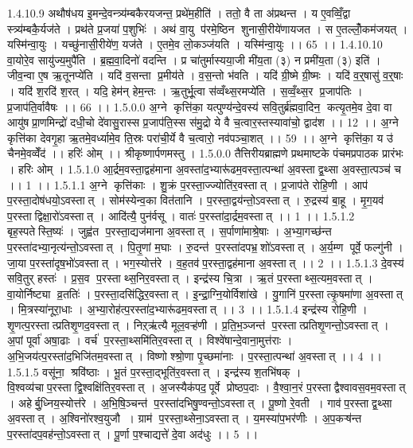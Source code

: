 1.4.10.9
अथौष॑धय इ॒मन्दे॒वन्त्र्य॑म्बकैरयजन्त॒ प्रथे॑म॒हीति॑ । ततो॒ वै ता अ॑प्रथन्त । य ए॒वव्विँ॒द्वा स्त्र्य॑म्बकै॒र्यज॑ते । प्रथ॑ते प्र॒जया॑ प॒शुभिः॑ । अथ॑ वा॒यु प॑रमे॒ष्ठिन॑ शुनासी॒रीये॑णायजत । स ए॒तल्लोँ॒कम॑जयत् । यस्मि॑न्वा॒युः । यच्छु॑नासी॒रीये॑ण॒ यज॑ते । ए॒तमे॒व लो॒कञ्ज॑यति । यस्मि॑न्वा॒युः ।। 65 ।।
1.4.10.10
वा॒योरे॒व सायु॑ज्य॒मुपै॑ति । ब्र॒ह्म॒वा॒दिनो॑ वदन्ति । प्र चा॑तुर्मास्यया॒जी मी॑य॒ता (३) न प्रमी॑य॒ता (३) इति॑ । जीव॒न्वा ए॒ष ऋ॒तूनप्ये॑ति । यदि॑ व॒सन्ता प्र॒मीय॑ते । व॒स॒न्तो भ॑वति । यदि॑ ग्री॒ष्मे ग्री॒ष्मः । यदि॑ व॒र्॒षासु॑ व॒र्॒षाः । यदि॑ श॒रदि॑ श॒रत् । यदि॒ हेम॑न् हेम॒न्तः । ऋ॒तुर्भू॒त्वा स॑व्वँथ्स॒रमप्ये॑ति । स॒व्वँ॒थ्स॒र प्र॒जाप॑तिः । प्र॒जाप॑ति॒र्वावैषः ।। 66 ।।
1.5.0.0
अ॒ग्ने कृत्ति॑का॒ यत्पुण्य॑न्दे॒वस्य॑ सवि॒तुर्ब्र॑ह्मवा॒दिन॒ कत्यृ॒तमे॒व दे॒वा वा आयु॑षप्रा॒णमिन्द्रो॑ दधी॒चो दे॑वासु॒रास्स प्र॒जाप॑ति॒स्स स॑मु॒द्रो ये वै च॒त्वार॒स्तस्यावा॑चो॒ द्वाद॑श ।। 12 ।। अ॒ग्ने कृत्ति॑का देवगृ॒हा ऋ॒तमे॒वर्ध्यामे॒व ति॒स्रः परा॑ची॒र्ये वै च॒त्वारो॒ नव॑पञ्चा॒शत् ।। 59 ।। अ॒ग्ने कृत्ति॑का॒ य उ॑ चैनमे॒वव्वेँद॑ ।। हरिः॑ ओम् ।। श्रीकृष्णार्पणमस्तु ।
1.5.0.0
तैत्तिरीयब्राह्मणे प्रथमाष्टके पंचमप्रपाठक प्रारंभः । हरिः ओम् ।
1.5.1.0
आ॒र्द्रम॒वस्ता॒द्वह॑माना अ॒वस्ता॑द॒भ्यारू॑ढम॒वस्ता॒त्पन्था॑ अ॒वस्ताद्व॒थ्सा अ॒वस्ता॒त्पञ्च॑ च ।। 1 ।।
1.5.1.1
अ॒ग्ने कृत्ति॑काः । शु॒क्रं प॒रस्ता॒ज्ज्योति॑र॒वस्तात् । प्र॒जाप॑ते रोहि॒णी । आप॑ प॒रस्ता॒दोष॑धयो॒ऽवस्तात् । सोम॑स्येन्व॒का वित॑तानि । प॒रस्ता॒द्वय॑न्तो॒ऽवस्तात् । रु॒द्रस्य॑ बा॒हू । मृ॒ग॒यव॑ प॒रस्ताद्विक्षा॒रो॑ऽवस्तात् । आदि॑त्यै॒ पुन॑र्वसू । वातः॑ प॒रस्ता॑दा॒र्द्रम॒वस्तात् ।। 1 ।।
1.5.1.2
बृह॒स्पतेस्ति॒ष्यः॑ । जुह्व॑त प॒रस्ता॒द्यज॑माना अ॒वस्तात् । स॒र्पाणा॑माश्रे॒षाः । अ॒भ्या॒गच्छ॑न्त प॒रस्ता॑दभ्या॒नृत्य॑न्तो॒ऽवस्तात् । पि॒तृ॒णां म॒घाः । रु॒दन्त॑ प॒रस्ता॑दपभ्र॒॒शो॑ऽवस्तात् । अ॒र्य॒म्ण पूर्वे॒ फल्गु॑नी । जा॒या प॒रस्ता॑दृष॒भो॑ऽवस्तात् । भग॒स्योत्त॑रे । व॒ह॒तव॑प॒रस्ता॒द्वह॑माना अ॒वस्तात् ।। 2 ।।
1.5.1.3
दे॒वस्य॑ सवि॒तुर् हस्तः॑ । प्र॒स॒व प॒रस्ताथ्स॒निर॒वस्तात् । इन्द्र॑स्य चि॒त्रा । ऋ॒तं प॒रस्ताथ्स॒त्यम॒वस्तात् । वा॒योर्निष्ट्या व्र॒ततिः॑ । प॒रस्ता॒दसि॑द्धिर॒वस्तात् । इ॒न्द्रा॒ग्नि॒योर्विशा॑खे । यु॒गानि॑ प॒रस्तात्कृ॒षमा॑णा अ॒वस्तात् । मि॒त्रस्या॑नूरा॒धाः । अ॒भ्या॒रोह॑त्प॒रस्ता॑द॒भ्यारू॑ढम॒वस्तात् ।। 3 ।।
1.5.1.4
इन्द्र॑स्य रोहि॒णी । शृ॒णत्प॒रस्तात्प्रतिशृ॒णद॒वस्तात् । निऱ्ऋ॑त्यै मूल॒वऱ्ह॑णी । प्र॒ति॒भ॒ञ्जन्त॑ प॒रस्तात्प्रतिशृ॒णन्तो॒ऽवस्तात् । अ॒पां पूर्वा॑ अषा॒ढाः । वर्च॑ प॒रस्ता॒थ्समि॑तिर॒वस्तात् । विश्वे॑षान्दे॒वाना॒मुत्त॑राः । अ॒भि॒जय॑त्प॒रस्ता॑द॒भिजि॑तम॒वस्तात् । विष्णोश्श्रो॒णा पृ॒च्छमा॑नाः । प॒रस्ता॒त्पन्था॑ अ॒वस्तात् ।। 4 ।।
1.5.1.5
वसू॑ना॒॒ श्रवि॑ष्ठाः । भू॒तं प॒रस्ता॒द्भूति॑र॒वस्तात् । इन्द्र॑स्य श॒तभि॑षक् । वि॒श्वव्य॑चाप॒रस्ताद्वि॒श्वक्षि॑तिर॒वस्तात् । अ॒जस्यैक॑पद॒पूर्वे प्रोष्ठप॒दाः । वै॒श्वा॒न॒रं प॒रस्ताद्वैश्वावस॒वम॒वस्तात् । अहेर्बु॒ध्निय॒स्योत्त॑रे । अ॒भि॒षि॒ञ्चन्त॑ प॒रस्ता॑दभिषु॒ण्वन्तो॒ऽवस्तात् । पू॒ष्णो रे॒वती । गाव॑प॒रस्ताद्व॒थ्सा अ॒वस्तात् । अ॒श्विनो॑रश्व॒युजौ । ग्राम॑ प॒रस्ता॒थ्सेना॒ऽवस्तात् । य॒मस्या॑प॒भर॑णीः । अ॒प॒कऱ्ष॑न्त प॒रस्ता॑दप॒वह॑न्तो॒ऽवस्तात् । पू॒र्णा प॒श्चाद्यत्ते॑ दे॒वा अद॑धुः ।। 5 ।।
